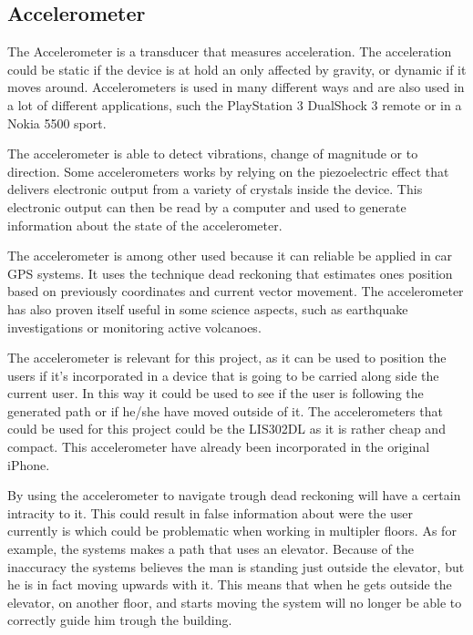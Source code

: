  
\subsection{Accelerometer}

The Accelerometer is a transducer that measures acceleration. The acceleration could be static if the device is at hold an only affected by gravity, or dynamic if it moves around\cite{acc_engi}. Accelerometers is used in many different ways and are also used in a lot of different applications, such the PlayStation 3 DualShock 3 remote\cite{acc_ps3} or in a Nokia 5500 sport\cite{acc_nokia}.


The accelerometer is able to detect vibrations, change of magnitude or to direction\cite{acc_engi}. Some accelerometers works by relying on the piezoelectric effect that delivers electronic output from a variety of crystals inside the device\cite{acc_piezo}. This electronic output can then be read by a computer and used to generate information about the state of the accelerometer.


The accelerometer is among other used because it can reliable be applied in car GPS systems. It uses the technique dead reckoning that estimates ones position based on previously coordinates and current vector movement\cite{acc_dead}. The accelerometer has also proven itself useful in some science aspects, such as earthquake investigations or monitoring active volcanoes\cite{acc_vulkan}. 


The accelerometer is relevant for this project, as it can be used to position the users if it's incorporated in a device that is going to be carried along side the current user. In this way it could be used to see if the user is following the generated path or if he/she have moved outside of it. The accelerometers that could be used for this project could be the LIS302DL as it is rather cheap and compact\cite{acc_price}\cite{acc_LIS302DL}. This accelerometer have already been incorporated in the original iPhone\cite{acc_iPhone}.


By using the accelerometer to navigate trough dead reckoning will have a certain intracity to it\cite{acc_inacc}. This could result in false information about were the user currently is which could be problematic when working in multipler floors. As for example, the systems makes a path that uses an elevator. Because of the inaccuracy the systems believes the man is standing just outside the elevator, but he is in fact moving upwards with it. This means that when he gets outside the elevator, on another floor, and starts moving the system will no longer be able to correctly guide him trough the building. 